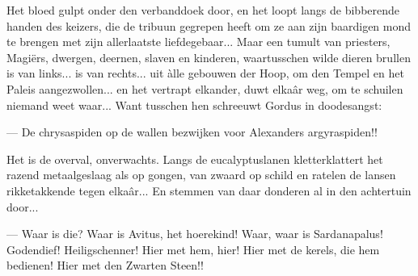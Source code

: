 \documentclass[a4paper, 12pt, oneside, dutch]{article}
\begin{document}
Het bloed gulpt onder den verbanddoek door, en het loopt langs de bibberende handen des keizers, die de tribuun gegrepen heeft om ze aan zijn baardigen mond te brengen met zijn allerlaatste liefdegebaar... Maar een tumult van priesters, Magiërs, dwergen, deernen, slaven en kinderen, waartusschen wilde dieren brullen is van links... is van rechts... uit àlle gebouwen der Hoop, om den Tempel en het Paleis aangezwollen... en het vertrapt elkander, duwt elkaâr weg, om te schuilen niemand weet waar... Want tusschen hen schreeuwt Gordus in doodesangst:

--- De chrysaspiden op de wallen bezwijken voor Alexanders argyraspiden!!

Het is de overval, onverwachts. Langs de eucalyptuslanen kletterklattert het razend metaalgeslaag als op gongen, van zwaard op schild en ratelen de lansen rikketakkende tegen elkaâr... En stemmen van daar donderen al in den achtertuin door...

--- Waar is die? Waar is Avitus, het hoerekind! Waar, waar is Sardanapalus! Godendief! Heiligschenner! Hier met hem, hier! Hier met de kerels, die hem bedienen! Hier met den Zwarten Steen!!
\end{document}
